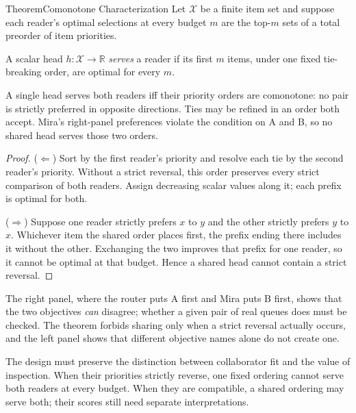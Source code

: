 \documentclass[11pt,a4paper]{article}
\theoremstyle{definition}
\theoremstyle{plain}
\begin{document}
\begin{pdclaim}{Theorem}{Comonotone Characterization}
\setlength{\parskip}{4pt plus 1pt}
\label{thm:comonotone}
Let $\mathcal X$ be a finite item set and suppose each reader's optimal selections at
every budget $m$ are the top-$m$ sets of a total preorder of item priorities.

A scalar head $h:\mathcal X\to\mathbb R$ \emph{serves} a reader if its first $m$ items,
under one fixed tie-breaking order, are optimal for every $m$.

A single head serves both readers iff their priority orders are comonotone:
no pair is strictly preferred in opposite directions. Ties may be refined
in an order both accept. Mira's right-panel preferences violate the
condition on A and B, so no shared head serves those two orders.
\end{pdclaim}
\begin{proof}
\setlength{\parskip}{4pt plus 1pt}
($\Leftarrow$) Sort by the first reader's priority and resolve each tie by
the second reader's priority. Without a strict reversal, this order
preserves every strict comparison of both readers. Assign decreasing
scalar values along it; each prefix is optimal for both.

($\Rightarrow$) Suppose one reader strictly prefers $x$ to $y$ and the
other strictly prefers $y$ to $x$. Whichever item the shared order places
first, the prefix ending there includes it without the other. Exchanging
the two improves that prefix for one reader, so it cannot be optimal at
that budget. Hence a shared head cannot contain a strict reversal.
\end{proof}
The right panel, where the router puts A first and Mira puts B first,
shows that the two objectives \emph{can} disagree; whether a given pair of
real queues does must be checked. The theorem forbids sharing only when a
strict reversal actually occurs, and the left panel shows that different
objective names alone do not create one.

The design must preserve the distinction between collaborator fit and the value
of inspection. When their priorities strictly reverse, one fixed ordering cannot
serve both readers at every budget. When they are compatible, a shared ordering
may serve both; their scores still need separate interpretations.

\end{document}
